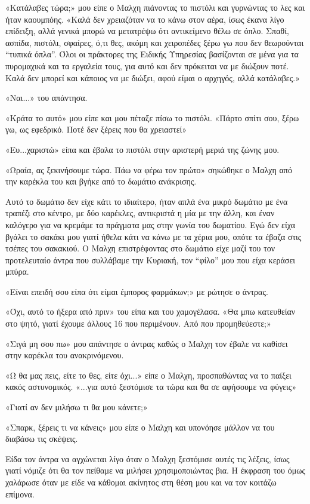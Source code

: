 \documentclass[12pt,twoside, openany]{book}
\begin{document}
«Κατάλαβες τώρα;» μου είπε ο Μαλχη πιάνοντας το πιστόλι και γυρνώντας το λες και ήταν καουμπόης. «Καλά δεν χρειαζόταν να το κάνω στον αέρα, ίσως έκανα λίγο επίδειξη, αλλά γενικά μπορώ να μετατρέψω ότι αντικείμενο θέλω σε όπλο. Σπαθί, ασπίδα, πιστόλι, σφαίρες, ό,τι θες, ακόμη και χειροπέδες ξέρω γω που δεν θεωρούνται “τυπικά όπλα”. Όλοι οι πράκτορες της Ειδικής Υπηρεσίας βασίζονται σε μένα για τα πυρομαχικά και τα εργαλεία τους, για αυτό και δεν πρόκειται να με διώξουν ποτέ. Καλά δεν μπορεί και κάποιος να με διώξει, αφού είμαι ο αρχηγός, αλλά κατάλαβες.»

«Ναι...» του απάντησα.

«Κράτα το αυτό» μου είπε και μου πέταξε πίσω το πιστόλι. «Πάρτο σπίτι σου, ξέρω γω, ως εφεδρικό. Ποτέ δεν ξέρεις που θα χρειαστεί»

«Ευ...χαριστώ» είπα και έβαλα το πιστόλι στην αριστερή μεριά της ζώνης μου.

«Ωραία, ας ξεκινήσουμε τώρα. Πάω να φέρω τον πρώτο» σηκώθηκε ο Μαλχη από την καρέκλα του και βγήκε από το δωμάτιο ανάκρισης.

Αυτό το δωμάτιο δεν είχε κάτι το ιδιαίτερο, ήταν απλά ένα μικρό δωμάτιο με ένα τραπέζι στο κέντρο, με δύο καρέκλες, αντικριστά η μία με την άλλη, και έναν καλόγερο για να κρεμάμε τα πράγματα μας στην γωνία του δωματίου. Εγώ δεν είχα βγάλει το σακάκι μου γιατί ήθελα κάτι να κάνω με τα χέρια μου, οπότε τα έβαζα στις τσέπες του σακακιού. Ο Μαλχη επιστρέφοντας στο δωμάτιο είχε μαζί του τον προτελευταίο άντρα που συλλάβαμε την Κυριακή, τον “φίλο” μου που είχα κεράσει μπύρα.

«Είναι επειδή σου είπα ότι είμαι έμπορος φαρμάκων;» με ρώτησε ο άντρας.

«Όχι, αυτό το ήξερα από πριν» του είπα και του χαμογέλασα. «Θα μπω κατευθείαν στο ψητό, γιατί έχουμε άλλους 16 που περιμένουν. Από που προμηθεύεστε;»

«Σιγά μη σου πω» μου απάντησε ο άντρας καθώς ο Μαλχη τον έβαλε να καθίσει στην καρέκλα του ανακρινόμενου.

«Ω θα μας πεις, είτε το θες, είτε όχι...» είπε ο Μαλχη, προσπαθώντας να το παίξει κακός αστυνομικός. «...για αυτό ξεστόμισε τα τώρα και θα σε αφήσουμε να φύγεις»

«Γιατί αν δεν μιλήσω τι θα μου κάνετε;»

«Σπαρκ, ξέρεις τι να κάνεις» μου είπε ο Μαλχη και υπονόησε μάλλον να του διαβάσω τις σκέψεις.

Είδα τον άντρα να αγχώνεται λίγο όταν ο Μαλχη ξεστόμισε αυτές τις λέξεις, ίσως γιατί νόμιζε ότι θα τον πείθαμε να μιλήσει χρησιμοποιώντας βια. Η έκφραση του όμως χαλάρωσε όταν με είδε να κάθομαι ακίνητος στη θέση μου και να τον κοιτάζω επίμονα.
\end{document}

